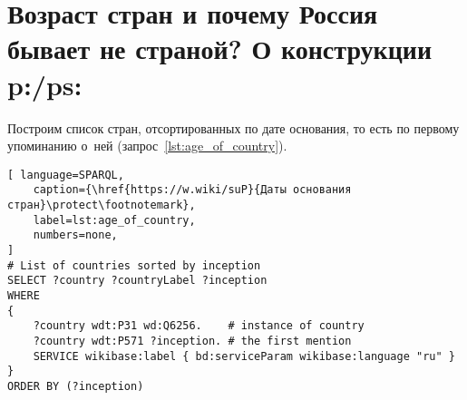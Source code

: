 %
%



\section{Возраст стран и почему Россия бывает не страной? О конструкции p:/ps:}
\label{ch:RussiaNotCountryPPS}



Построим список стран, отсортированных по дате основания, 
то есть по первому упоминанию о~ней (запрос~\ref{lst:age_of_country}).

\begin{lstlisting}[ language=SPARQL, 
    caption={\href{https://w.wiki/suP}{Даты основания стран}\protect\footnotemark},
    label=lst:age_of_country, 
    numbers=none,
]
# List of countries sorted by inception 
SELECT ?country ?countryLabel ?inception
WHERE
{
	?country wdt:P31 wd:Q6256.    # instance of country
	?country wdt:P571 ?inception. # the first mention
	SERVICE wikibase:label { bd:serviceParam wikibase:language "ru" }
}
ORDER BY (?inception)
\end{lstlisting}

